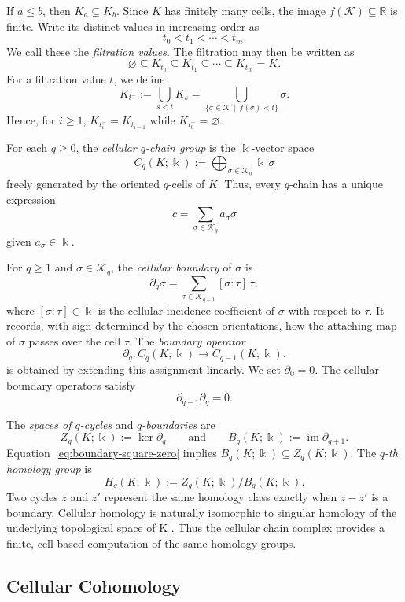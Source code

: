 \documentclass[11pt]{article}
\theoremstyle{paperdefinition}
\theoremstyle{paperplain}
\theoremstyle{paperremark}
\begin{document}
If $a\leq b$, then $K_a\subseteq K_b$. Since $K$ has finitely many cells, the image $f(\mathcal K) \subseteq \mathbb{R}$ is finite. Write its distinct values in increasing order as
\[
t_0<t_1<\cdots<t_m.
\]
We call these the \emph{filtration values}. The filtration may then be written as
\[
\varnothing\subseteq K_{t_0}\subseteq K_{t_1}\subseteq\cdots\subseteq K_{t_m}=K.
\]
For a filtration value $t$, we define
\[
K_{t^-} := \bigcup_{s<t}K_s = \bigcup_{\{\sigma\in\mathcal K\,\mid\,f(\sigma)<t\}}\sigma.
\]
Hence, for $i \geq 1$, $K_{t_i^-}=K_{t_{i-1}}$ while $K_{t_0^-}=\varnothing$.

For each $q\geq0$, the \emph{cellular $q$-chain group} is the $\Bbbk$-vector space
\[
C_q(K;\Bbbk) := \bigoplus_{\sigma\in\mathcal K_q}\Bbbk\,\sigma
\]
freely generated by the oriented $q$-cells of $K$. Thus, every $q$-chain has a unique expression
\[
c=\sum_{\sigma\in\mathcal K_q}a_\sigma\sigma
\]
given $a_\sigma\in\Bbbk$.

For $q \geq 1$ and $\sigma \in \mathcal K_q$, the \emph{cellular boundary} of $\sigma$ is
\[
\partial_q\sigma = \sum_{\tau\in\mathcal K_{q-1}}[\sigma:\tau]\,\tau,
\]
where $[\sigma:\tau]\in\Bbbk$ is the cellular incidence coefficient of $\sigma$ with respect to $\tau$. It records, with sign determined by the chosen orientations, how the attaching map of $\sigma$ passes over the cell $\tau$. The \emph{boundary operator}
\[
\partial_q:C_q(K;\Bbbk)\longrightarrow C_{q-1}(K;\Bbbk).
\]
is obtained by extending this assignment linearly. We set $\partial_0 = 0$. The cellular boundary operators satisfy
\begin{equation}
\label{eq:boundary-square-zero}
\partial_{q-1}\partial_q=0.
\end{equation}

The \emph{spaces of $q$-cycles} and \emph{$q$-boundaries} are
\[
Z_q(K;\Bbbk):=\ker\partial_q
\qquad\text{and}\qquad
B_q(K;\Bbbk):=\operatorname{im}\partial_{q+1}.
\]
Equation~\eqref{eq:boundary-square-zero} implies $B_q(K;\Bbbk)\subseteq Z_q(K;\Bbbk)$. The \emph{$q$-th homology group} is
\[
H_q(K;\Bbbk) := Z_q(K;\Bbbk)/B_q(K;\Bbbk).
\]
Two cycles $z$ and $z'$ represent the same homology class exactly when $z-z'$ is a boundary. Cellular homology is naturally isomorphic to singular homology of the underlying topological space of K \cite{hatcher2002algebraic}. Thus the cellular chain complex provides a finite, cell-based computation of the same homology groups.

\subsection{Cellular Cohomology}
\label{subsec:cohomology}
\end{document}

